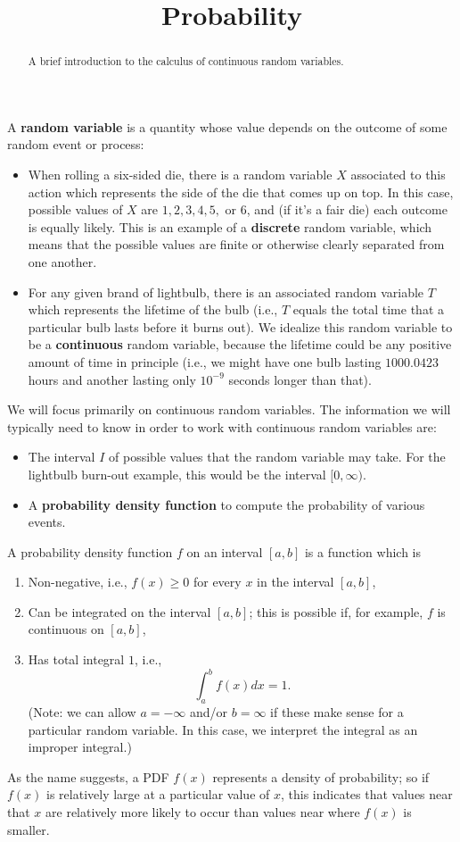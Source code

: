\documentclass{ximera}
\title{Probability}
\begin{document}
\begin{abstract}
  A brief introduction to the calculus of continuous random variables.
\end{abstract}
\maketitle


A \textbf{random variable} is a quantity whose value depends on the outcome of some random event or process:
\begin{itemize}
\item When rolling a six-sided die, there is a random variable $X$ associated to this action which represents the side of the die that comes up on top. In this case, possible values of $X$ are $1,2,3,4,5,$ or $6$, and (if it's a fair die) each outcome is equally likely. This is an example of a \textbf{discrete} random variable, which means that the possible values are finite or otherwise clearly separated from one another.
\item For any given brand of lightbulb, there is an associated random variable $T$ which represents the lifetime of the bulb (i.e., $T$ equals the total time that a particular bulb lasts before it burns out). We idealize this random variable to be a \textbf{continuous} random variable, because the lifetime could be any positive amount of time in principle (i.e., we might have one bulb lasting $1000.0423$ hours and another lasting only $10^{-9}$ seconds longer than that).
\end{itemize}

We will focus primarily on continuous random variables. The information we will typically need to know in order to work with continuous random variables are:
\begin{itemize}
\item The interval $I$ of possible values that the random variable may take. For the lightbulb burn-out example, this would be the interval $[0,\infty)$.
\item A \textbf{probability density function} to compute the probability of various events.
\end{itemize}
\begin{definition}
A probability density function $f$ on an interval $[a,b]$ is a function which is
\begin{enumerate}
\item Non-negative, i.e., $f(x) \geq 0$ for every $x$ in the interval $[a,b]$,
\item Can be integrated on the interval $[a,b]$; this is possible if, for example, $f$ is continuous on $[a,b]$,
\item Has total integral $1$, i.e.,
\[ \int_a^b f(x) dx = 1. \]
(Note: we can allow $a = -\infty$ and/or $b = \infty$ if these make sense for a particular random variable. In this case, we interpret the integral as an improper integral.)
\end{enumerate}
\end{definition}
As the name suggests, a PDF $f(x)$ represents a density of probability; so if $f(x)$ is relatively large at a particular value of $x$, this indicates that values near that $x$ are relatively more likely to occur than values near where $f(x)$ is smaller.
\end{document}
